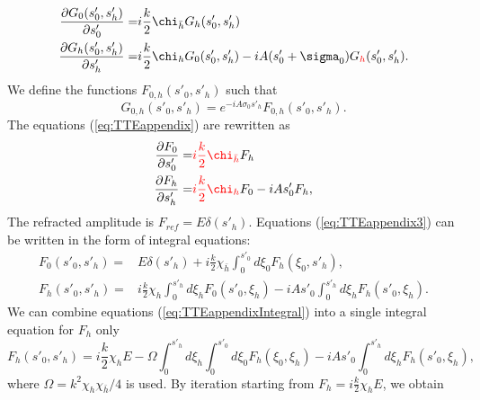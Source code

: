\documentclass[preprint]{iucr}              %
\newcommand{\inred}[1]{{\color{red}#1}}
\begin{document}
\begin{subequations}
\label{eq:TTEappendix}
\begin{align}
    \frac{\partial G_0(s'_0,s'_h)}{\partial s'_0}=&i\frac{k}{2}\chi_{\bar h} G_h(s'_0,s'_h) \\
    \frac{\partial G_h(s'_0,s'_h)}{\partial s'_h}=&i\frac{k}{2}\chi_{h} G_0(s'_0,s'_h) -i A (s'_0+\sigma_0)G\inred{_h}(s'_0,s'_h).
\end{align}
\end{subequations}
\inred{We define} the functions $F_{0,h}(s'_0,s'_h)$ such that
\begin{equation}
\label{eq:TTEappendix2}
    G_{0,h}(s'_0,s'_h) = e^{-iA\sigma_0s'_h} F_{0,h}(s'_0,s'_h).
\end{equation}
\inred{The} equations (\ref{eq:TTEappendix}) are rewritten as
\begin{subequations}
\label{eq:TTEappendix3}
\begin{align}
    \frac{\partial F_0}{\partial s'_0}=&\inred{i\frac{k}{2} \chi_{\bar h}} F_h \\
    \frac{\partial F_h}{\partial s'_h}=& \inred{i\frac{k}{2}\chi_{h}}F_0-i A s'_0 F_h,
\end{align}
\end{subequations}
The refracted amplitude is $F_{ref}=E\delta(s'_h)$. 
Equations (\ref{eq:TTEappendix3}) can be written in the form of integral equations:
\begin{subequations}
\label{eq:TTEappendixIntegral}
\begin{align}
    F_0(s'_0,s'_h) =& E \delta(s'_h) +i\frac{k}{2}\chi_{\bar h}\int_0^{s'_0} d\xi_0F_h(\xi_0,s'_h),\\
    F_h(s'_0,s'_h)=& i\frac{k}{2}\chi_{h}\int_0^{s'_h} d\xi_h F_0(s'_0,\xi_h) - i A s'_0 \int_0^{s'_h} d\xi_h F_h(s'_0,\xi_h).
\end{align}
\end{subequations}
We can combine equations (\ref{eq:TTEappendixIntegral}) into a single integral equation \inred{for $F_h$ only}
\begin{equation}
    \label{eq:TTEappendixSingleIntegral}
    F_h(s'_0,s'_h) = i\frac{k}{2}\chi_h E - \Omega \int_0^{s'_h} d \xi_h \int_0^{s'_0} d\xi_0 F_h(\xi_0,\xi_h) - i A s'_0 \int_0^{s'_h} d\xi_h F_h(s'_0,\xi_h),
\end{equation}
\inred{where $\Omega=k^2\chi_h\chi_{\bar h}/4$ is used.} By iteration starting from $F_h=i\frac{k}{2}\chi_hE$, we obtain
\end{document}
